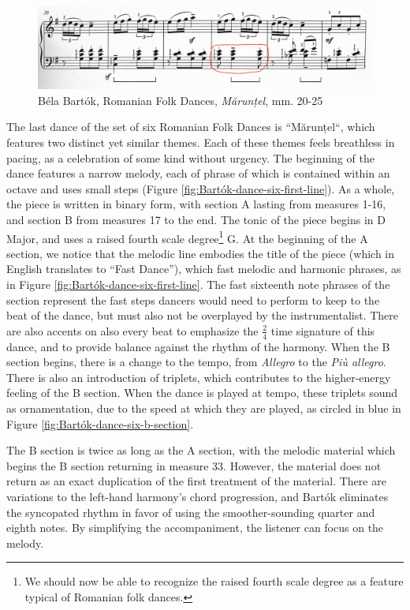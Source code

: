 \begin{figure}
  \centering
  \includegraphics[width=\textwidth]{figures/bartok-dance-six-b-section-syncopation.jpg}
  \caption{Béla Bartók, Romanian Folk Dances, \textit{Mărunțel}, mm. 20-25}
  \label{fig:Bartók-dance-six-b-section-syncopation}
\end{figure}


The last dance of the set of six Romanian Folk Dances is ``Mărunțel``, which features two distinct yet similar themes. Each of these themes feels breathless in pacing, as a celebration of some kind without urgency. The beginning of the dance features a narrow melody, each of phrase of which is contained within an octave and uses small steps (Figure \ref{fig:Bartók-dance-six-first-line}\autocite{Lung_2016}). As a whole, the piece is written in binary form, with section A lasting from measures 1-16, and section B from measures 17 to the end. The tonic of the piece begins in D Major, and uses a raised fourth scale degree\footnote{We should now be able to recognize the raised fourth scale degree as a feature typical of Romanian folk dances.} G\musSharp{}. At the beginning of the A section, we notice that the melodic line embodies the title of the piece (which in English translates to ``Fast Dance''), which fast melodic and harmonic phrases, as in Figure \ref{fig:Bartók-dance-six-first-line}\autocite{Lung_2016}. The fast sixteenth note phrases of the section represent the fast steps dancers would need to perform to keep to the beat of the dance, but must also not be overplayed by the instrumentalist. There are also accents on also every beat to emphasize the $\frac{2}{4}$ time signature of this dance, and to provide balance against the rhythm of the harmony. When the B section begins, there is a change to the tempo, from \textit{Allegro} to the \textit{Più allegro}. There is also an introduction of triplets, which contributes to the higher-energy feeling of the B section. When the dance is played at tempo, these triplets sound as ornamentation, due to the speed at which they are played, as circled in blue in Figure \ref{fig:Bartók-dance-six-b-section}\autocite{Lung_2016}. 

The B section is twice as long as the A section, with the melodic material which begins the B section returning in measure 33. However, the material does not return as an exact duplication of the first treatment of the material. There are variations to the left-hand harmony's chord progression, and Bartók eliminates the syncopated rhythm in favor of using the smoother-sounding quarter and eighth notes. By simplifying the accompaniment, the listener can focus on the melody.

